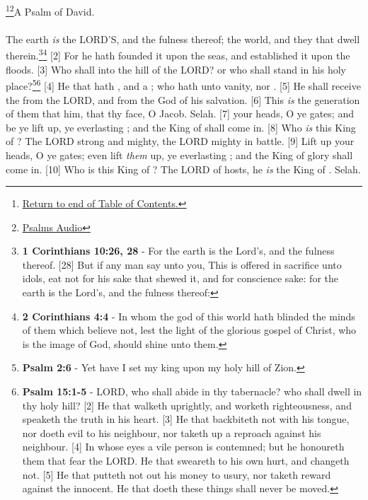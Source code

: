 \footnote{\textcolor[cmyk]{0.99998,1,0,0}{\hyperlink{TOC}{Return to end of Table of Contents.}}}\footnote{\href{https://www.audioverse.org/english/audiobibles/books/ENGKJV/O/Ps/1}{\textcolor[cmyk]{0.99998,1,0,0}{Psalms Audio}}}\textcolor[cmyk]{0.99998,1,0,0}{A Psalm of David.}\\
\\
\textcolor[cmyk]{0.99998,1,0,0}{The earth \emph{is} the LORD'S, and the fulness thereof; the world, and they that dwell therein.}\footnote{\textbf{1 Corinthians 10:26, 28} - For the earth is the Lord’s, and the fulness thereof. [28] But if any man say unto you, This is offered in sacrifice unto idols, eat not for his sake that shewed it, and for conscience sake: for the earth is the Lord’s, and the fulness thereof:}\footnote{\textbf{2 Corinthians 4:4} - In whom the god of this world hath blinded the minds of them which believe not, lest the light of the glorious gospel of Christ, who is the image of God, should shine unto them.}
[2] \textcolor[cmyk]{0.99998,1,0,0}{For he hath founded it upon the seas, and established it upon the floods.}
[3] \textcolor[cmyk]{0.99998,1,0,0}{Who shall  into the hill of the LORD? or who shall stand in his holy place?}\footnote{\textbf{Psalm 2:6} - Yet have I set my king upon my holy hill of Zion.}\footnote{\textbf{Psalm 15:1-5} - LORD, who shall abide in thy tabernacle? who shall dwell in thy holy hill? [2] He that walketh uprightly, and worketh righteousness, and speaketh the truth in his heart. [3] He that backbiteth not with his tongue, nor doeth evil to his neighbour, nor taketh up a reproach against his neighbour. [4] In whose eyes a vile person is contemned; but he honoureth them that fear the LORD. He that sweareth to his own hurt, and changeth not. [5] He that putteth not out his money to usury, nor taketh reward against the innocent. He that doeth these things shall never be moved.}
[4] \textcolor[cmyk]{0.99998,1,0,0}{He that hath , and a ; who hath  unto vanity, nor .}
[5] \textcolor[cmyk]{0.99998,1,0,0}{He shall receive the  from the LORD, and  from the God of his salvation.}
[6] \textcolor[cmyk]{0.99998,1,0,0}{This \emph{is} the generation of them that  him, that  thy face, O Jacob. Selah.}
[7] \textcolor[cmyk]{0.99998,1,0,0}{ your heads, O ye gates; and be ye lift up, ye everlasting ; and the King of  shall come in.}
[8] \textcolor[cmyk]{0.99998,1,0,0}{Who \emph{is} this King of ? The LORD strong and mighty, the LORD mighty in battle.}
[9] \textcolor[cmyk]{0.99998,1,0,0}{Lift up your heads, O ye gates; even lift \emph{them} up, ye everlasting ; and the King of glory shall come in.}
[10] \textcolor[cmyk]{0.99998,1,0,0}{Who is this King of ? The LORD of hosts, he \emph{is} the King of . Selah.}